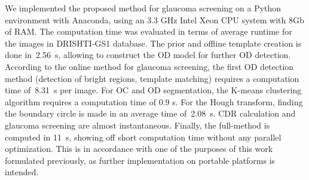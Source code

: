 We implemented the proposed method for glaucoma screening on a Python environment with Anaconda, using an 3.3 GHz Intel Xeon CPU system with 8Gb of RAM. The computation time was evaluated in terms of average runtime for the images in DRISHTI-GS1 database. The prior and offline template creation is done \mbox{in 2.56 s}, allowing to construct the OD model for further OD detection. According to the online method for glaucoma screening, the first OD detection method (detection of bright regions, template matching) requires a computation time \mbox{of 8.31 s} per image. For OC and OD segmentation, the K-means clustering algorithm requires a computation time of 0.9 s. For the Hough transform, finding the boundary circle is made in an average time \mbox{of 2.08 s}. CDR calculation and glaucoma screening are almost instantaneous. Finally, the full-method is computed in \mbox{11 s}, showing off short computation time without any parallel optimization. This is in accordance with one of the purposes of this work formulated previously, as further implementation on portable platforms is intended.